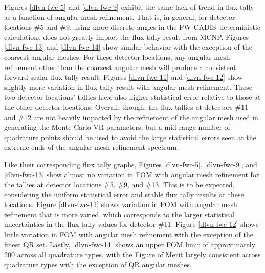 \documentclass{article} %
\newcommand{\fwc}{\mbox{FW-CADIS}}
\begin{document}
Figures \ref{dlvn-fwc-5} and \ref{dlvn-fwc-9} exhibit the same lack of trend in
flux tally as a function of angular mesh refinement. That is, in general, for
detector locations \#5 and \#9, using more discrete angles in the \fwc\
deterministic calculations does not greatly impact the flux tally result from
MCNP. Figures \ref{dlvn-fwc-13} and \ref{dlvn-fwc-14} show similar behavior
with the exception of the coarsest angular meshes. For these detector
locations, any angular mesh refinement other than the coarsest angular mesh
will produce a consistent forward scalar flux tally result. Figures
\ref{dlvn-fwc-11} and \ref{dlvn-fwc-12} show slightly more variation in flux
tally result with angular mesh refinement. These two detector locations'
tallies have also higher statistical error relative to those at the other
detector locations. Overall, though, the flux tallies at detectors \#11 and
\#12 are not heavily impacted by the refinement of the angular mesh used in
generating the Monte Carlo VR parameters, but a mid-range number of
quadrature points should be used to avoid the large statistical errors seen at
the extreme ends of the angular mesh refinement spectrum.

Like their corresponding flux tally graphs, Figures \ref{dlvn-fwc-5},
\ref{dlvn-fwc-9}, and \ref{dlvn-fwc-13} show almost no variation in FOM with
angular mesh refinement for the tallies at detector locations \#5, \#9, and
\#13. This is to be expected, considering the uniform statistical error and
stable flux tally results at these locations. Figure \ref{dlvn-fwc-11} shows
variation in FOM with angular mesh refinement that is more varied, which
corresponds to the larger statistical uncertainties in the flux tally values
for detector \#11. Figure \ref{dlvn-fwc-12} shows little variation in FOM with
angular mesh refinement with the exception of the finest QR set. Lastly,
\ref{dlvn-fwc-14} shows an upper FOM limit of approximately 200 across all
quadrature types, with the Figure of Merit largely consistent across
quadrature types with the exception of QR angular meshes.
\end{document}

